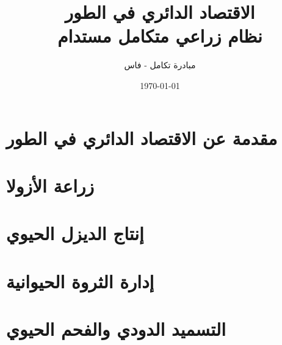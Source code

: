 \documentclass[12pt,a4paper]{report}
\title{الاقتصاد الدائري في الطور\\
\large نظام زراعي متكامل مستدام}
\author{مبادرة تكامل - فاس}
\date{\today}
\begin{document}
\maketitle
\tableofcontents

\chapter{مقدمة عن الاقتصاد الدائري في الطور}


\chapter{زراعة الأزولا}









\chapter{إنتاج الديزل الحيوي}









\chapter{إدارة الثروة الحيوانية}









\chapter{التسميد الدودي والفحم الحيوي}








\end{document}
